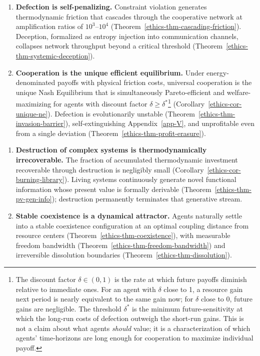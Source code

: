 \documentclass[11pt]{article}
\theoremstyle{plain}
\theoremstyle{definition}
\theoremstyle{remark}
\begin{document}
\begin{enumerate}
\def\labelenumi{\arabic{enumi}.}
\setcounter{enumi}{1}
\item
  \textbf{Defection is self-penalizing.} Constraint violation generates
  thermodynamic friction that cascades through the cooperative network
  at amplification ratios of \(10^3\)--\(10^4\)
  (Theorem~\ref{ethics-thm-cascading-friction}). Deception, formalized
  as entropy injection into communication channels, collapses network
  throughput beyond a critical threshold
  (Theorem~\ref{ethics-thm-systemic-deception}).
\item
  \textbf{Cooperation is the unique efficient equilibrium.} Under
  energy-denominated payoffs with physical friction costs, universal
  cooperation is the unique Nash Equilibrium that is simultaneously
  Pareto-efficient and welfare-maximizing for agents with discount
  factor \(\delta \geq \delta^*\)\footnote{The discount factor
    \(\delta \in (0,1)\) is the rate at which future payoffs diminish
    relative to immediate ones. For an agent with \(\delta\) close to 1,
    a resource gain next period is nearly equivalent to the same gain
    now; for \(\delta\) close to 0, future gains are negligible. The
    threshold \(\delta^*\) is the minimum future-sensitivity at which
    the long-run costs of defection outweigh the short-run gains. This
    is not a claim about what agents \emph{should} value; it is a
    characterization of which agents' time-horizons are long enough for
    cooperation to maximize individual payoff.}
  (Corollary~\ref{ethics-cor-unique-ne}). Defection is evolutionarily
  unstable (Theorem~\ref{ethics-thm-invasion-barrier}),
  self-extinguishing Appendix~\ref{app-V}, and unprofitable even from a
  single deviation (Theorem~\ref{ethics-thm-profit-erasure}).
\end{enumerate}

\begin{enumerate}
\def\labelenumi{\arabic{enumi}.}
\setcounter{enumi}{3}
\item
  \textbf{Destruction of complex systems is thermodynamically
  irrecoverable.} The fraction of accumulated thermodynamic investment
  recoverable through destruction is negligibly small
  (Corollary~\ref{ethics-cor-burning-library}). Living systems
  continuously generate novel functional information whose present value
  is formally derivable (Theorem~\ref{ethics-thm-pv-gen-info});
  destruction permanently terminates that generative stream.
\item
  \textbf{Stable coexistence is a dynamical attractor.} Agents naturally
  settle into a stable coexistence configuration at an optimal coupling
  distance from resource centers (Theorem~\ref{ethics-thm-coexistence}),
  with measurable freedom bandwidth
  (Theorem~\ref{ethics-thm-freedom-bandwidth}) and irreversible
  dissolution boundaries (Theorem~\ref{ethics-thm-dissolution}).
\end{enumerate}
\end{document}
